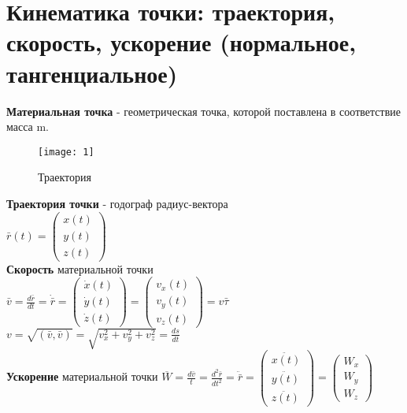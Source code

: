 \documentclass[12pt]{article}
\begin{document}
	\pagestyle{fancy}
\section{Кинематика точки: траектория, скорость, ускорение (нормальное, тангенциальное)}
	\textbf{Материальная точка} - геометрическая точка, которой поставлена в соответствие масса m. \\
	\begin{wrapfigure}{r}{0.30\textwidth}
		\vspace{-20pt}
			\texttt{[image: 1]}
			\caption{Траектория}
		\vspace{-30pt}
	\end{wrapfigure}
	\textbf{Траектория точки} -  годограф радиус-вектора \\
	$\bar{r}(t) =	
		\begin{pmatrix} x(t) \\ y(t)\\ z(t) \end{pmatrix}$
	\\
	\textbf{Скорость} материальной точки \\
	$\bar{v}=\frac{d\bar{r}}{dt}=\dot{\bar{r}} =
		\begin{pmatrix} \dot{x}(t) \\ \dot{y}(t)\\ \dot{z}(t)\end{pmatrix}= 	
		\begin{pmatrix} v_x(t) \\ v_y(t)\\ v_z(t)\end{pmatrix}= v \bar{\tau}$
	\\$ v=\sqrt{(\bar{v}, \bar{v})}=\sqrt{v_x^2+v_y^2+v_z^2}=\frac{ds}{dt}$
	\\
	\textbf{Ускорение} материальной точки  $\overline{W}=\frac{d\bar{v}}{t}=\frac{d^2\bar{r}}{dt^2}=\ddot{\bar{r}} =
		\begin{pmatrix} \ddot{x(t)} \\ \ddot{y(t)}\\ \ddot{z(t)} \end{pmatrix} =
		\begin{pmatrix} W_x \\ W_y\\ W_z\end{pmatrix}
	$
\end{document}
